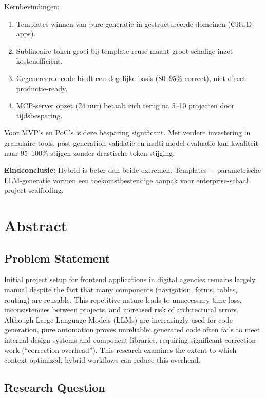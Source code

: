 Kernbevindingen:
\begin{enumerate}
  \item Templates winnen van pure generatie in gestructureerde domeinen (CRUD-apps).
  
  \item Sublineaire token-groei bij template-reuse maakt groot-schalige inzet kostenefficiënt.
  
  \item Gegenereerde code biedt een degelijke basis (80--95\% correct), niet direct productie-ready.
  
  \item MCP-server opzet (24 uur) betaalt zich terug na 5--10 projecten door tijdsbesparing.
\end{enumerate}

Voor MVP's en PoC's is deze besparing significant. Met verdere investering in granulaire tools, post-generation validatie en multi-model evaluatie kan kwaliteit naar 95--100\% stijgen zonder drastische token-stijging.

\textbf{Eindconclusie:} Hybrid is beter dan beide extremen. Templates + parametrische LLM-generatie vormen een toekomstbestendige aanpak voor enterprise-schaal project-scaffolding.

\newpage
\chapter*{Abstract}

\section*{Problem Statement}

Initial project setup for frontend applications in digital agencies remains largely manual despite the fact that many components (navigation, forms, tables, routing) are reusable. This repetitive nature leads to unnecessary time loss, inconsistencies between projects, and increased risk of architectural errors. Although Large Language Models (LLMs) are increasingly used for code generation, pure automation proves unreliable: generated code often fails to meet internal design systems and component libraries, requiring significant correction work (``correction overhead''). This research examines the extent to which context-optimized, hybrid workflows can reduce this overhead.

\section*{Research Question}

